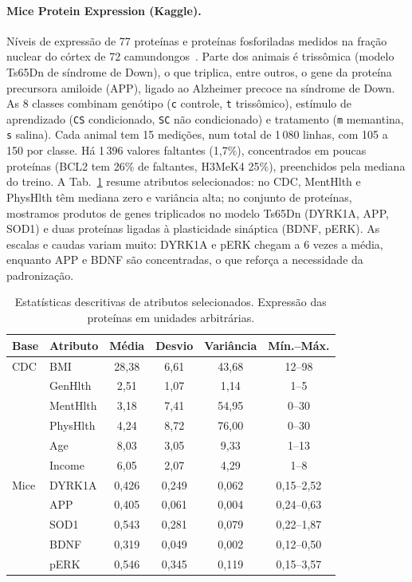 \documentclass[aps,pre,twocolumn,10pt,nofootinbib]{revtex4-2}
\begin{document}
\paragraph{Mice Protein Expression (Kaggle).}
Níveis de expressão de 77 proteínas e proteínas fosforiladas medidos na
fração nuclear do córtex de 72 camundongos~\cite{higuera2015}. Parte dos
animais é trissômica (modelo Ts65Dn de síndrome de Down), o que triplica,
entre outros, o gene da proteína precursora amiloide (APP), ligado ao
Alzheimer precoce na síndrome de Down. As 8 classes combinam genótipo
(\texttt{c} controle, \texttt{t} trissômico), estímulo de aprendizado
(\texttt{CS} condicionado, \texttt{SC} não condicionado) e tratamento
(\texttt{m} memantina, \texttt{s} salina). Cada animal tem 15 medições, num
total de 1\,080 linhas, com 105 a 150 por classe. Há 1\,396 valores
faltantes (1,7\%), concentrados em poucas proteínas (BCL2 tem 26\% de
faltantes, H3MeK4 25\%), preenchidos pela mediana do treino.
A Tab.~\ref{tab:estat} resume atributos selecionados: no CDC, MentHlth e
PhysHlth têm mediana zero e variância alta; no conjunto de proteínas,
mostramos produtos de genes triplicados no modelo Ts65Dn (DYRK1A, APP,
SOD1) e duas proteínas ligadas à plasticidade sináptica (BDNF, pERK). As
escalas e caudas variam muito: DYRK1A e pERK chegam a 6 vezes a média,
enquanto APP e BDNF são concentradas, o que reforça a necessidade da
padronização.

\begin{table}[t]
\caption{Estatísticas descritivas de atributos selecionados. Expressão
das proteínas em unidades arbitrárias.}
\label{tab:estat}
\begin{ruledtabular}
\begin{tabular}{llcccc}
Base & Atributo & Média & Desvio & Variância & Mín.--Máx. \\
\hline
CDC  & BMI      & 28,38 & 6,61 & 43,68 & 12--98 \\
     & GenHlth  & 2,51  & 1,07 & 1,14  & 1--5 \\
     & MentHlth & 3,18  & 7,41 & 54,95 & 0--30 \\
     & PhysHlth & 4,24  & 8,72 & 76,00 & 0--30 \\
     & Age      & 8,03  & 3,05 & 9,33  & 1--13 \\
     & Income   & 6,05  & 2,07 & 4,29  & 1--8 \\
\hline
Mice & DYRK1A   & 0,426 & 0,249 & 0,062 & 0,15--2,52 \\
     & APP      & 0,405 & 0,061 & 0,004 & 0,24--0,63 \\
     & SOD1     & 0,543 & 0,281 & 0,079 & 0,22--1,87 \\
     & BDNF     & 0,319 & 0,049 & 0,002 & 0,12--0,50 \\
     & pERK     & 0,546 & 0,345 & 0,119 & 0,15--3,57 \\
\end{tabular}
\end{ruledtabular}
\end{table}
\end{document}
